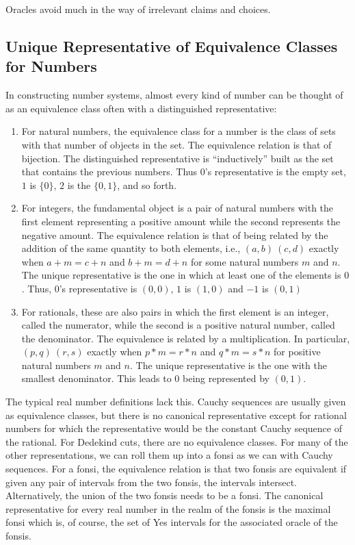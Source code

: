 \documentclass[12pt]{article}
\begin{document}
Oracles avoid much in the way of irrelevant claims and choices.

\subsection{Unique Representative of Equivalence Classes for Numbers}

In constructing number systems, almost every kind of number can be thought of as an equivalence class often with a distinguished representative:

\begin{enumerate}
    \item For natural numbers, the equivalence class for a number is the class of sets with that number of objects in the set. The equivalence relation is that of bijection. The distinguished representative is ``inductively'' built as the set that contains the previous numbers. Thus $0$'s representative is the empty set, $1$ is $\{0\}$, $2$ is the $\{0,1\}$, and so forth. 
    \item For integers, the fundamental object is a pair of natural numbers with the first element representing a positive amount while the second represents the negative amount. The equivalence relation is that of being related by the addition of the same quantity to both elements, i.e., $(a,b) ~ (c,d)$ exactly when $a+m = c+n$ and $b+m = d+n$ for some natural numbers $m$ and $n$. The unique representative is the one in which at least one of the elements is $0$. Thus, $0$'s representative  is $(0,0)$, $1$ is $(1,0)$ and $-1$ is $(0,1)$
    \item For rationals, these are also pairs in which the first element is an integer, called the numerator, while the second is a positive natural number, called the denominator. The equivalence is related by a multiplication. In particular,  $(p,q) ~ (r,s)$ exactly when $p*m = r*n$ and $q*m = s*n$ for positive natural numbers $m$ and $n$. The unique representative is the one with the smallest denominator. This leads to $0$ being represented by $(0, 1)$. 
\end{enumerate}

The typical real number definitions lack this. Cauchy sequences are usually given as equivalence classes, but there is no canonical representative except for rational numbers for which the representative would be the constant Cauchy sequence of the rational. For Dedekind cuts, there are no equivalence classes. For many of the other representations, we can roll them up into a fonsi as we can with Cauchy sequences. For a fonsi, the equivalence relation is that two fonsis are equivalent if given any pair of intervals from the two fonsis, the intervals intersect. Alternatively, the union of the two fonsis needs to be a fonsi. The canonical representative for every real number in the realm of the fonsis is the maximal fonsi which is, of course, the set of Yes intervals for the associated oracle of the fonsis.
\end{document}
